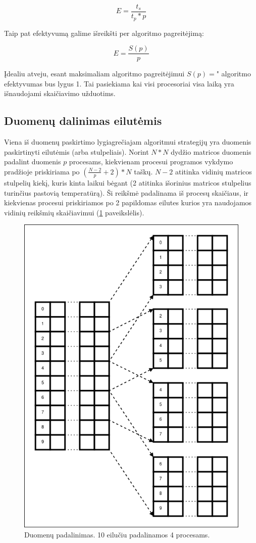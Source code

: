 \documentclass{VUMIFPSbakalaurinis}
\begin{document}
\[ E = \frac{t_s}{t_p * p}\]

Taip pat efektyvumą galime išreikšti per algoritmo pagreitėjimą:

\[ E = \frac{S(p)}{p}\]

Įdealiu atveju, esant maksimaliam algoritmo pagreitėjimui $S(p)=$" algoritmo efektyvumas bus lygus 1. Tai pasiekiama kai visi procesoriai visa laiką yra išnaudojami skaičiavimo užduotims. 


\subsection{Duomenų dalinimas eilutėmis}

Viena iš duomenų paskirtimo lygiagrečiajam algoritmui strategijų yra duomenis paskirtinyti eilutėmis (arba stulpeliais).
Norint $N*N$ dydžio matricos duomenis padalint duomenis $p$ procesams, kiekvienam procesui programos vykdymo pradžioje priskiriama po  $(\frac{N-2}{p}+2) * N$ taškų. 
$N-2$ atitinka vidinių matricos stulpelių kiekį, kuris kinta laikui bėgant (2 atitinka išorinius matricos stulpelius turinčius pastovią temperatūrą). 
Ši reikšmė padalinama iš procesų skaičiaus, ir kiekvienas procesui priskiriamos po 2 papildomas eilutes kurios yra naudojamos vidinių reikšmių skaičiavimui (\ref{img:distribution} paveikslėlis).
\begin{figure}[H]
    \centering
    \includegraphics[scale=0.4]{img/distribution.png}
    \caption{Duomenų padalinimas. 10 eilučiu padalinamos 4 procesams.}
    \label{img:distribution}
\end{figure}
\end{document}
